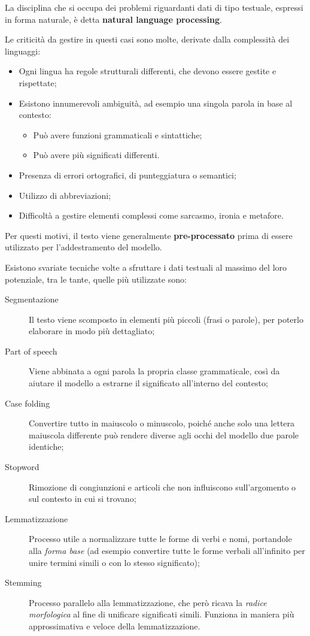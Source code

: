 \documentclass[12pt,a4paper,twoside,openright]{book}
\begin{document}
La disciplina che si occupa dei problemi riguardanti dati di tipo testuale, espressi in forma naturale, è detta \textbf{natural language processing}.

Le criticità da gestire in questi casi sono molte, derivate dalla complessità dei linguaggi:
\begin{itemize}
    \item Ogni lingua ha regole strutturali differenti, che devono essere gestite e rispettate;
    \item Esistono innumerevoli ambiguità, ad esempio una singola parola in base al contesto:
    \begin{itemize}
        \item Può avere funzioni grammaticali e sintattiche;
        \item Può avere più significati differenti.
    \end{itemize}
    \item Presenza di errori ortografici, di punteggiatura o semantici;
    \item Utilizzo di abbreviazioni;
    \item Difficoltà a gestire elementi complessi come sarcasmo, ironia e metafore.
\end{itemize}

Per questi motivi, il testo viene generalmente \textbf{pre-processato} prima di essere utilizzato per l'addestramento del modello.

Esistono svariate tecniche volte a sfruttare i dati testuali al massimo del loro potenziale, tra le tante, quelle più utilizzate sono:
\begin{description}
    \item [Segmentazione] Il testo viene scomposto in elementi più piccoli (frasi o parole), per poterlo elaborare in modo più dettagliato;
    \item [Part of speech] Viene abbinata a ogni parola la propria classe grammaticale, così da aiutare il modello a estrarne il significato all'interno del contesto;
    \item [Case folding] Convertire tutto in maiuscolo o minuscolo, poiché anche solo una lettera maiuscola differente può rendere diverse agli occhi del modello due parole identiche;
    \item [Stopword] Rimozione di congiunzioni e articoli che non influiscono sull'argomento o sul contesto in cui si trovano; 
    \item [Lemmatizzazione] Processo utile a normalizzare tutte le forme di verbi e nomi, portandole alla \emph{forma base} (ad esempio convertire tutte le forme verbali all'infinito per unire termini simili o con lo stesso significato);  
    \item [Stemming] Processo parallelo alla lemmatizzazione, che però ricava la \emph{radice morfologica} al fine di unificare significati simili. Funziona in maniera più approssimativa e veloce della lemmatizzazione.
\end{description}
\end{document}
